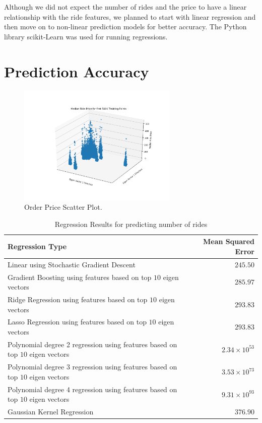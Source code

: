 \documentclass[paper=a4, fontsize=11pt]{scrartcl} %
\numberwithin{equation}{section} %
\numberwithin{table}{section} %
\begin{document}
Although we did not expect the number of rides and the price to have a linear relationship with the ride features, we planned to start with linear regression and then move on to non-linear prediction models for better accuracy. The Python library scikit-Learn \cite{sklearn} was used for running regressions.

\section{Prediction Accuracy}

\begin{figure}[!htb]
\centering
\includegraphics[width=3in]{figures/OrderPrice3DScatter.png}
\caption{Order Price Scatter Plot.}
\label{price}
\end{figure}

    \begin{table}[!h] 
    \centering
    \caption{Regression Results for predicting number of rides}
    \label{results}
    \begin{tabular}{|l|r|}
      \hline
   Regression Type  & Mean Squared Error \\
      \hline      
      Linear using Stochastic Gradient Descent&   $245.50$ \\
      \hline      
      Gradient Boosting using features based on top $10$ eigen vectors &    $285.97$    \\
      \hline
      Ridge Regression using features based on top $10$ eigen vectors&    $293.83$    \\
      \hline
      Lasso Regression using features based on top $10$ eigen vectors&    $293.83$    \\
      \hline
     Polynomial degree 2 regression using features based on top $10$ eigen vectors &    $2.34\times10^{53}$    \\
      \hline
     Polynomial degree 3 regression using features based on top $10$ eigen vectors &    $3.53\times10^{73}$    \\
      \hline
     Polynomial degree 4 regression using features based on top $10$ eigen vectors &    $9.31\times10^{93}$    \\
      \hline
      Gaussian Kernel Regression &    $376.90$    \\
      \hline
    \end{tabular}
    \end{table}
\end{document}
